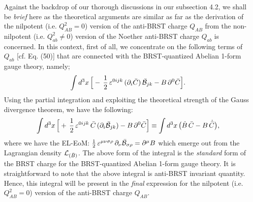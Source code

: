 \documentclass[12pt]{article}
\begin{document}
Against the backdrop of our thorough discussions in our subsection 4.2, we shall be {\it brief} here as the theoretical arguments are similar
as far as the derivation of the nilpotent (i.e. $Q_{AB}^2 = 0 $) version of the anti-BRST charge  $Q_{AB}$ from the non-nilpotent
(i.e. $Q_{ab}^2 \neq 0 $) version of the Noether anti-BRST charge $Q_{ab}$ is concerned. In this context, first of all, we concentrate on the
following terms of $Q_{ab}$ [cf. Eq. (50)] that are connected with the BRST-quantized Abelian 1-form gauge theory, namely;  
 \begin{eqnarray}\label{52}
\int d^3 x\, \Big [-\,\dfrac{1}{2}\, \varepsilon^{0ijk}\, (\partial_i \bar C)\, \bar {\cal B}_{jk} - B \, \partial^0 \bar C \Big ].
\end{eqnarray}
Using the partial integration and exploiting the theoretical strength of the Gauss divergence theorem, we have the following:
 \begin{eqnarray}\label{53}
\int d^3 x\, \Big [ +\,\dfrac{1}{2}\, \varepsilon^{0ijk}\,  \bar C\, (\partial_i \bar {\cal B}_{jk}) - B \, \partial^0 \bar C \Big ]
\equiv \int d^3 x\, \big (\dot B \, \bar C - B\, \dot {\bar C} \big ),
\end{eqnarray}
where we have the EL-EoM: $
\frac{1}{2}\, \varepsilon^{\mu\nu\sigma\rho} \, \partial_\nu \bar {\cal B}_{\sigma\rho} = \partial^\mu B$ 
which emerge out from the Lagrangian density ${\cal L}_{(\bar B)}$. The above form of the integral is the {\it standard} form of the BRST charge
for the BRST-quantized Abelian 1-form gauge theory. It is straightforward to note that the above integral is anti-BRST invariant quantity. Hence,
this integral will be present in the {\it final} expression for the nilpotent  (i.e. $Q_{AB}^2 = 0 $) version of the anti-BRST charge $Q_{AB}$.
\end{document}
